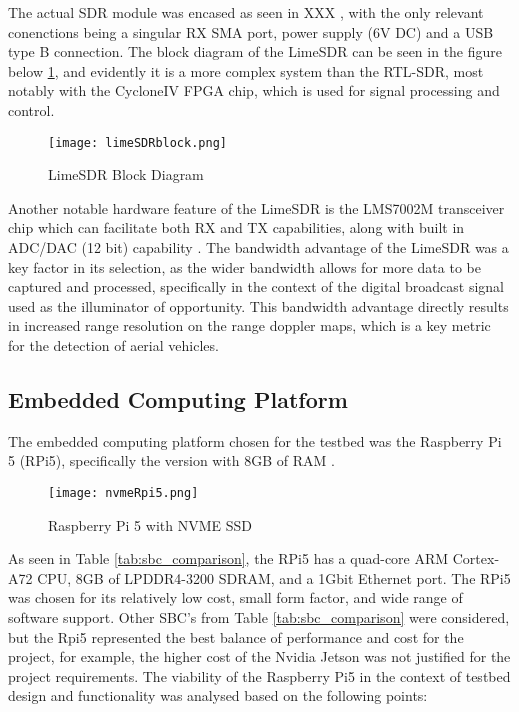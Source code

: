 The actual SDR module was encased as seen in XXX , with the only relevant conenctions being a singular RX SMA port, power supply (6V DC) and a USB type B connection. The block diagram of the LimeSDR can be seen in the figure below \ref{fig:limeSDRblock}, and evidently it is a more complex system than the RTL-SDR, most notably with the CycloneIV FPGA chip, which is used for signal processing and control.

\begin{figure}[htbp]
    \centering
    \texttt{[image: limeSDRblock.png]}
    \caption{LimeSDR Block Diagram \cite{limesdr_usb}}
    \label{fig:limeSDRblock}
\end{figure}

Another notable hardware feature of the LimeSDR is the LMS7002M transceiver chip which can facilitate both RX and TX capabilities, along with built in ADC/DAC (12 bit) capability \cite{limesdr_usb}. The bandwidth advantage of the LimeSDR was a key factor in its selection, as the wider bandwidth allows for more data to be captured and processed, specifically in the context of the digital broadcast signal used as the illuminator of opportunity. This bandwidth advantage directly results in increased range resolution on the range doppler maps, which is a key metric for the detection of aerial vehicles. 


\subsection{Embedded Computing Platform \label{sec:embedded computing}}



The embedded computing platform chosen for the testbed was the Raspberry Pi 5 (RPi5), specifically the version with 8GB of RAM \cite{core_electronics_rpi5}. 

\begin{figure}[htbp]
    \centering
    \texttt{[image: nvmeRpi5.png]}
    \caption{Raspberry Pi 5 with NVME SSD \cite{pimoroni_nvme_base}}
    \label{fig:Rpi5}
\end{figure}

As seen in Table \ref{tab:sbc_comparison}, the RPi5 has a quad-core ARM Cortex-A72 CPU, 8GB of LPDDR4-3200 SDRAM, and a 1Gbit Ethernet port. The RPi5 was chosen for its relatively low cost, small form factor, and wide range of software support. Other SBC's from Table \ref{tab:sbc_comparison} were considered, but the Rpi5 represented the best balance of performance and cost for the project, for example, the higher cost of the Nvidia Jetson was not justified for the project requirements. The viability of the Raspberry Pi5 in the context of testbed design and functionality was analysed based on the following points:

